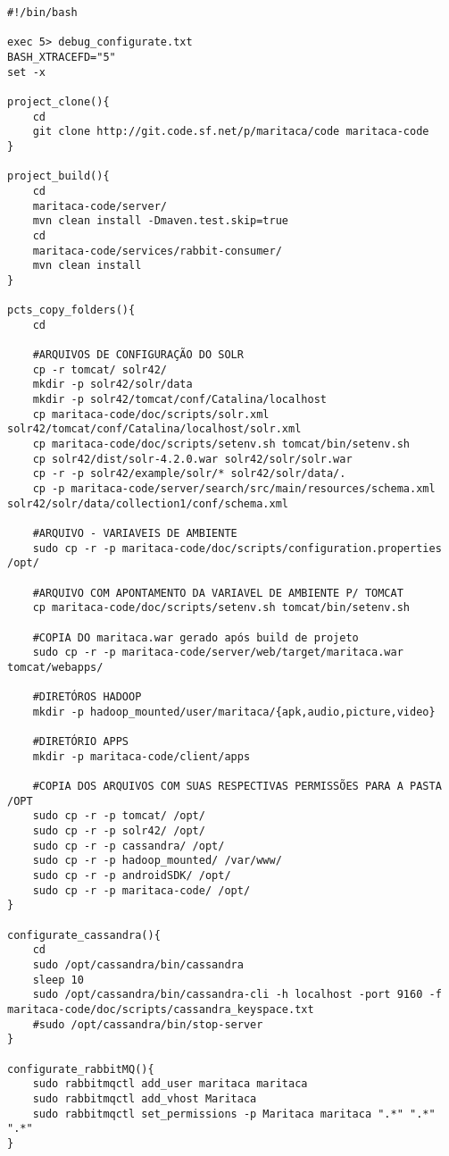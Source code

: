 \begin{lstlisting}[style=Bash]
#!/bin/bash

exec 5> debug_configurate.txt
BASH_XTRACEFD="5"
set -x

project_clone(){
	cd 
	git clone http://git.code.sf.net/p/maritaca/code maritaca-code 
}

project_build(){
	cd 
	maritaca-code/server/ 
	mvn clean install -Dmaven.test.skip=true
	cd
	maritaca-code/services/rabbit-consumer/
	mvn clean install
}

pcts_copy_folders(){
	cd 

	#ARQUIVOS DE CONFIGURAÇÃO DO SOLR
	cp -r tomcat/ solr42/ 
	mkdir -p solr42/solr/data 
	mkdir -p solr42/tomcat/conf/Catalina/localhost 
	cp maritaca-code/doc/scripts/solr.xml solr42/tomcat/conf/Catalina/localhost/solr.xml
	cp maritaca-code/doc/scripts/setenv.sh tomcat/bin/setenv.sh 
	cp solr42/dist/solr-4.2.0.war solr42/solr/solr.war 
	cp -r -p solr42/example/solr/* solr42/solr/data/.
	cp -p maritaca-code/server/search/src/main/resources/schema.xml solr42/solr/data/collection1/conf/schema.xml

	#ARQUIVO - VARIAVEIS DE AMBIENTE
	sudo cp -r -p maritaca-code/doc/scripts/configuration.properties /opt/

	#ARQUIVO COM APONTAMENTO DA VARIAVEL DE AMBIENTE P/ TOMCAT
	cp maritaca-code/doc/scripts/setenv.sh tomcat/bin/setenv.sh

	#COPIA DO maritaca.war gerado após build de projeto
	sudo cp -r -p maritaca-code/server/web/target/maritaca.war tomcat/webapps/ 

	#DIRETÓROS HADOOP
	mkdir -p hadoop_mounted/user/maritaca/{apk,audio,picture,video} 

	#DIRETÓRIO APPS
	mkdir -p maritaca-code/client/apps 
	
	#COPIA DOS ARQUIVOS COM SUAS RESPECTIVAS PERMISSÕES PARA A PASTA /OPT
	sudo cp -r -p tomcat/ /opt/ 
	sudo cp -r -p solr42/ /opt/ 
	sudo cp -r -p cassandra/ /opt/ 
	sudo cp -r -p hadoop_mounted/ /var/www/ 
	sudo cp -r -p androidSDK/ /opt/
	sudo cp -r -p maritaca-code/ /opt/
}

configurate_cassandra(){
	cd 
	sudo /opt/cassandra/bin/cassandra
	sleep 10
	sudo /opt/cassandra/bin/cassandra-cli -h localhost -port 9160 -f maritaca-code/doc/scripts/cassandra_keyspace.txt 
	#sudo /opt/cassandra/bin/stop-server 
}

configurate_rabbitMQ(){
	sudo rabbitmqctl add_user maritaca maritaca 
	sudo rabbitmqctl add_vhost Maritaca 
	sudo rabbitmqctl set_permissions -p Maritaca maritaca ".*" ".*" ".*" 
}


\end{lstlisting}
